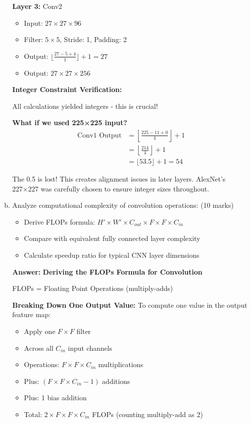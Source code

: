 \documentclass[12pt]{article}
\newcommand{\answer}[1]{{\color{answercolor}\textbf{Answer:} #1}}
\newcommand{\explanation}[1]{{\color{explanationcolor}#1}}
\begin{document}
\begin{enumerate}[(a)]
{{    \textbf{Layer 3:} Conv2
    \begin{itemize}
        \item Input: $27 \times 27 \times 96$
        \item Filter: $5 \times 5$, Stride: 1, Padding: 2
        \item Output: $\lfloor\frac{27 - 5 + 4}{1}\rfloor + 1 = 27$
        \item Output: $27 \times 27 \times 256$
    \end{itemize}
    }
    
    \textbf{Integer Constraint Verification:}
    
    \explanation{
    All calculations yielded integers - this is crucial!
    
    \textbf{What if we used 225×225 input?}
    \begin{align}
    \text{Conv1 Output} &= \left\lfloor\frac{225 - 11 + 0}{4}\right\rfloor + 1\\
    &= \left\lfloor\frac{214}{4}\right\rfloor + 1\\
    &= \lfloor 53.5 \rfloor + 1 = 54
    \end{align}
    
    The 0.5 is lost! This creates alignment issues in later layers. AlexNet's 227×227 was carefully chosen to ensure integer sizes throughout.
    }
    }
    
    \item Analyze computational complexity of convolution operations: \hfill (10 marks)
    \begin{itemize}
        \item Derive FLOPs formula: $H' \times W' \times C_{out} \times F \times F \times C_{in}$
        \item Compare with equivalent fully connected layer complexity
        \item Calculate speedup ratio for typical CNN layer dimensions
    \end{itemize}
    
    \answer{
    \textbf{Deriving the FLOPs Formula for Convolution}
    
    \explanation{
    FLOPs = Floating Point Operations (multiply-adds)
    
    \textbf{Breaking Down One Output Value:}
    To compute one value in the output feature map:
    \begin{itemize}
        \item Apply one $F \times F$ filter
        \item Across all $C_{in}$ input channels
        \item Operations: $F \times F \times C_{in}$ multiplications
        \item Plus: $(F \times F \times C_{in} - 1)$ additions
        \item Plus: 1 bias addition
        \item Total: $2 \times F \times F \times C_{in}$ FLOPs (counting multiply-add as 2)
    \end{itemize}
    
}}
\end{enumerate}
\end{document}
